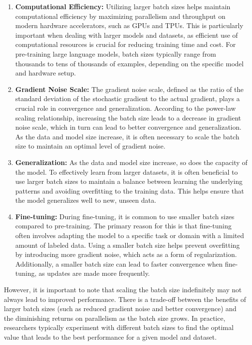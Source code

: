 \documentclass[12pt]{article}
\begin{document}
\begin{enumerate}
\item \textbf{Computational Efficiency:} Utilizing larger batch sizes helps maintain computational efficiency by maximizing parallelism and throughput on modern hardware accelerators, such as GPUs and TPUs. This is particularly important when dealing with larger models and datasets, as efficient use of computational resources is crucial for reducing training time and cost. For pre-training large language models, batch sizes typically range from thousands to tens of thousands of examples, depending on the specific model and hardware setup.

\item \textbf{Gradient Noise Scale:} The gradient noise scale, defined as the ratio of the standard deviation of the stochastic gradient to the actual gradient, plays a crucial role in convergence and generalization. According to the power-law scaling relationship, increasing the batch size leads to a decrease in gradient noise scale, which in turn can lead to better convergence and generalization. As the data and model size increase, it is often necessary to scale the batch size to maintain an optimal level of gradient noise.

\item \textbf{Generalization:} As the data and model size increase, so does the capacity of the model. To effectively learn from larger datasets, it is often beneficial to use larger batch sizes to maintain a balance between learning the underlying patterns and avoiding overfitting to the training data. This helps ensure that the model generalizes well to new, unseen data.

\item \textbf{Fine-tuning:} During fine-tuning, it is common to use smaller batch sizes compared to pre-training. The primary reason for this is that fine-tuning often involves adapting the model to a specific task or domain with a limited amount of labeled data. Using a smaller batch size helps prevent overfitting by introducing more gradient noise, which acts as a form of regularization. Additionally, a smaller batch size can lead to faster convergence when fine-tuning, as updates are made more frequently.
\end{enumerate}

However, it is important to note that scaling the batch size indefinitely may not always lead to improved performance. There is a trade-off between the benefits of larger batch sizes (such as reduced gradient noise and better convergence) and the diminishing returns on parallelism as the batch size grows. In practice, researchers typically experiment with different batch sizes to find the optimal value that leads to the best performance for a given model and dataset.
\end{document}

